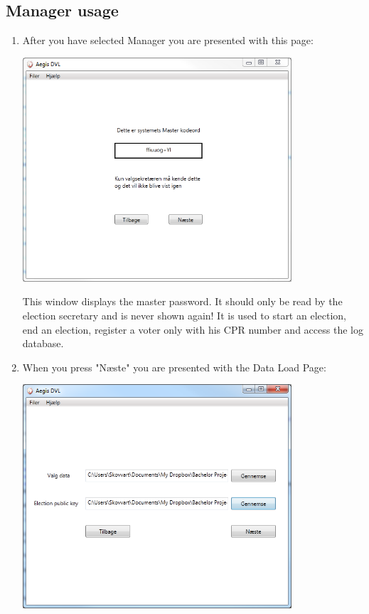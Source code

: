 \documentclass[a4paper]{report}
\begin{document}
\subsection*{Manager usage}
\begin{enumerate}
\item After you have selected Manager you are presented with this page: \\
\begin{center}
\includegraphics[width=100mm]{MasterPassword.png}
\end{center}
This window displays the master password. It should only be read by the election secretary and is never shown again! It is used to start an election, end an election, register a voter only with his CPR number and access the log database.
\item When you press "N\ae ste" you are presented with the Data Load Page: \\
\begin{center}
\includegraphics[width=100mm]{DataLoad.png}

\end{center}
\end{enumerate}
\end{document}
